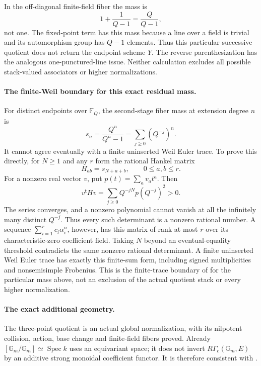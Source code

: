 In the off-diagonal finite-field fiber the mass is
\[
                  1+\frac1{Q-1}=\frac Q{Q-1},
\]
not one. The fixed-point term has this mass because
a line over a field is trivial and its automorphism
group has \(Q-1\) elements.
Thus this particular successive quotient does not
return the endpoint scheme \(Y\).
The reverse parenthesization has the analogous
one-punctured-line issue.
Neither calculation excludes all possible
stack-valued associators or higher normalizations.

\paragraph{The finite-Weil boundary for this exact residual mass.}
For distinct endpoints over \(\mathbb F_Q\),
the second-stage fiber mass at extension degree \(n\) is
\begin{equation}\label{eq:variableQuotientResidualMass}
       s_n=\frac{Q^n}{Q^n-1}
                   =\sum_{j\ge0}(Q^{-j})^n.
\end{equation}
It cannot agree eventually with a finite
uninserted Weil Euler trace.
To prove this directly, for \(N\ge1\) and any \(r\)
form the rational Hankel matrix
\[
             H_{ab}=s_{N+a+b},\qquad 0\le a,b\le r.
\]
For a nonzero real vector \(v\), put
\(p(t)=\sum_av_at^a\). Then
\[
 v^{\mathsf t}Hv
     =\sum_{j\ge0}Q^{-jN}p(Q^{-j})^2>0.
\]
The series converges, and a nonzero polynomial
cannot vanish at all the infinitely many distinct
\(Q^{-j}\).
Thus every such determinant is a nonzero rational number.
A sequence \(\sum_{i=1}^rc_i\alpha_i^n\), however,
has this matrix of rank at most \(r\) over its
characteristic-zero coefficient field.
Taking \(N\) beyond an eventual-equality threshold
contradicts the same nonzero rational determinant.
A finite uninserted Weil Euler trace has exactly
this finite-sum form, including signed multiplicities
and nonsemisimple Frobenius.
This is the finite-trace boundary of 
for the particular mass above, not an exclusion
of the actual quotient stack or every higher normalization.

\paragraph{The exact additional geometry.}
The three-point quotient is an actual global
normalization, with its nilpotent collision, action,
base change and finite-field fibers proved.
Already \([\mathbb G_m/\mathbb G_m]\simeq\operatorname{Spec}k\)
uses an equivariant space; it does not invert
\(R\Gamma_c(\mathbb G_m,E)\) by an additive strong
monoidal coefficient functor.
It is therefore consistent with .

